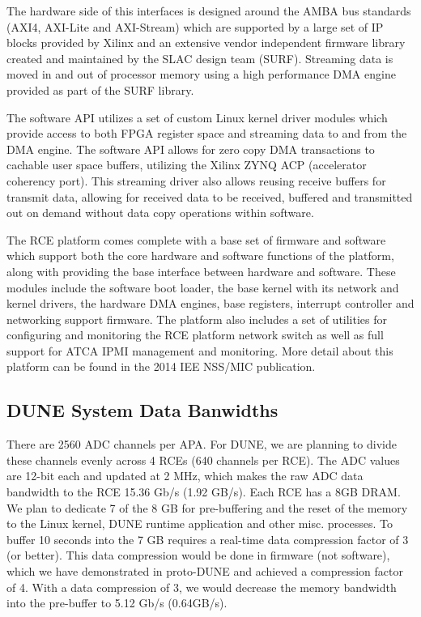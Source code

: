 The hardware side of this interfaces is designed around the AMBA 
bus standards (AXI4, AXI-Lite and 
AXI-Stream) which are supported by a large set of IP blocks 
provided by Xilinx and an extensive vendor independent firmware 
library created and maintained by the SLAC design team (SURF). Streaming data 
is moved in and out of processor memory using a high performance DMA 
engine provided as part of the SURF library. 

The software API utilizes a set of custom Linux kernel driver modules which 
provide access to both FPGA register space and streaming data to and from the 
DMA engine. The software API allows for zero copy DMA transactions to cachable user 
space buffers, utilizing the Xilinx ZYNQ ACP (accelerator coherency port). This 
streaming driver also allows reusing receive buffers for transmit data, allowing for 
received data to be received, buffered and transmitted out on demand without data copy
operations within software.

The RCE platform comes complete with a base set of firmware and software
which support both the core hardware and software functions of the platform, along with
providing the base interface between hardware and software. These modules include the 
software boot loader, the base kernel with its network and kernel drivers, the hardware
DMA engines, base registers, interrupt controller and networking support firmware. The platform
also includes a set of utilities for configuring and monitoring the RCE platform network
switch as well as full support for ATCA IPMI management and monitoring. More detail about this platform can be found in the 
2014 IEE NSS/MIC publication\cite{IEEE_RCE}.

\subsection{DUNE System Data Banwidths}

There are 2560 ADC channels per APA. For DUNE, we are planning to divide these channels evenly across 4 RCEs (640 channels per RCE).  The ADC values are 12-bit each and updated at 2 MHz, which makes the raw ADC data bandwidth to the RCE 15.36 Gb/s (1.92 GB/s).  Each RCE has a 8GB DRAM. We plan to dedicate 7 of the 8 GB for pre-buffering and the reset of the memory to the Linux kernel, DUNE runtime application and other misc. processes. To buffer 10 seconds into the 7 GB requires a real-time data compression factor of 3 (or better).  This data compression would be done in firmware (not software), which we have demonstrated in proto-DUNE and achieved a compression factor of 4.  With a data compression of 3, we would decrease the memory bandwidth into the pre-buffer to 5.12 Gb/s (0.64GB/s). 


